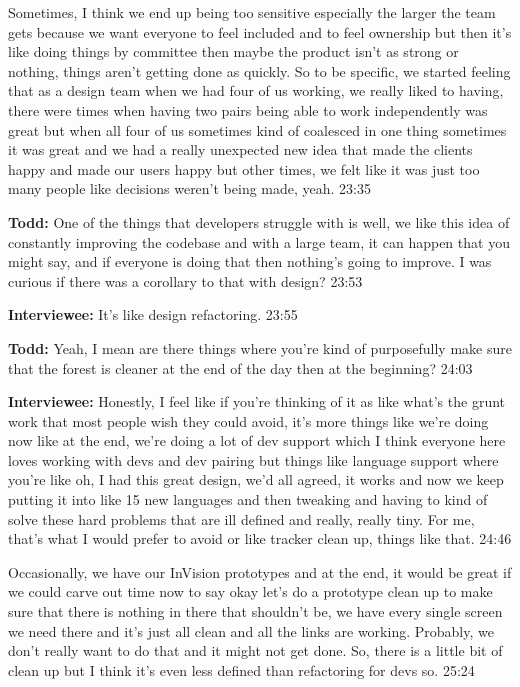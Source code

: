 Sometimes, I think we end up being too sensitive especially the larger the team gets because we want everyone to feel included and to feel ownership but then it's like doing things by committee  then maybe the product isn't as strong or nothing, things aren't getting done as quickly.  So to be specific, we started feeling that as a design team when we had four of us working, we really liked to having, there were times when having two pairs being able to work independently was great but when all four of us sometimes kind of coalesced in one thing sometimes it was great and we had a really unexpected new idea that made the clients happy and made our users happy but other times, we felt like it was just too many people like decisions weren't being made, yeah.  23:35

\textbf{Todd:} One of the things that developers struggle with is well, we like this idea of constantly improving the codebase and with a large team, it can happen that you might say,  and if everyone is doing that then nothing's going to improve.  I was curious if there was a corollary to that with design?  23:53

\textbf{Interviewee:} It's like design refactoring.  23:55

\textbf{Todd:} Yeah, I mean are there things where you're kind of purposefully make sure that the forest is cleaner at the end of the day then at the beginning?  24:03

\textbf{Interviewee:} Honestly, I feel like if you're thinking of it as like what's the grunt work that most people wish they could avoid, it's more things like we're doing now like at the end, we're doing a lot of dev support which I think everyone here loves working with devs and dev pairing but things like language support where you're like oh, I had this great design, we'd all agreed, it works and now we keep putting it into like 15 new languages and then tweaking and having to kind of solve these hard problems that are ill defined and really, really tiny.  For me, that's what I would prefer to avoid or like tracker clean up, things like that.  24:46

Occasionally, we have our InVision prototypes and at the end, it would be great if we could carve out time now to say okay let's do a prototype clean up to make sure that there is nothing in there that shouldn't be, we have every single screen we need there and it's just all clean and all the links are working.  Probably, we don't really want to do that and it might not get done.  So, there is a little bit of clean up but I think it's even less defined than refactoring for devs so.  25:24

